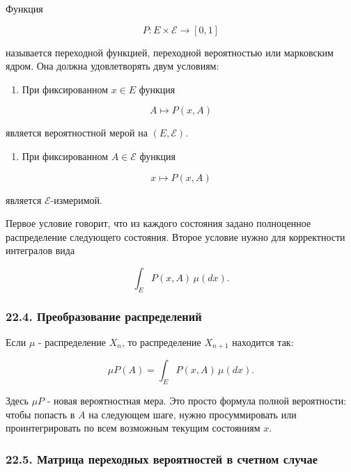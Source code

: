 \documentclass[
  11pt,
  a4paper,
]{article}
\providecommand{\tightlist}{%
  \setlength{\itemsep}{0pt}\setlength{\parskip}{0pt}}
\begin{document}
Функция

\[
P:E\times\mathcal E\to[0,1]
\]

называется переходной функцией, переходной вероятностью или марковским
ядром. Она должна удовлетворять двум условиям:

\begin{enumerate}
\def\labelenumi{\arabic{enumi}.}
\tightlist
\item
  При фиксированном \(x\in E\) функция
\end{enumerate}

\[
A\mapsto P(x,A)
\]

является вероятностной мерой на \((E,\mathcal E)\).

\begin{enumerate}
\def\labelenumi{\arabic{enumi}.}
\setcounter{enumi}{1}
\tightlist
\item
  При фиксированном \(A\in\mathcal E\) функция
\end{enumerate}

\[
x\mapsto P(x,A)
\]

является \(\mathcal E\)-измеримой.

Первое условие говорит, что из каждого состояния задано полноценное
распределение следующего состояния. Второе условие нужно для
корректности интегралов вида

\[
\int_E P(x,A)\,\mu(dx).
\]

\subsubsection{22.4. Преобразование
распределений}\label{ux43fux440ux435ux43eux431ux440ux430ux437ux43eux432ux430ux43dux438ux435-ux440ux430ux441ux43fux440ux435ux434ux435ux43bux435ux43dux438ux439}

Если \(\mu\) - распределение \(X_n\), то распределение \(X_{n+1}\)
находится так:

\[
\mu P(A)=\int_E P(x,A)\,\mu(dx).
\]

Здесь \(\mu P\) - новая вероятностная мера. Это просто формула полной
вероятности: чтобы попасть в \(A\) на следующем шаге, нужно
просуммировать или проинтегрировать по всем возможным текущим состояниям
\(x\).

\subsubsection{22.5. Матрица переходных вероятностей в счетном
случае}\label{ux43cux430ux442ux440ux438ux446ux430-ux43fux435ux440ux435ux445ux43eux434ux43dux44bux445-ux432ux435ux440ux43eux44fux442ux43dux43eux441ux442ux435ux439-ux432-ux441ux447ux435ux442ux43dux43eux43c-ux441ux43bux443ux447ux430ux435}
\end{document}
